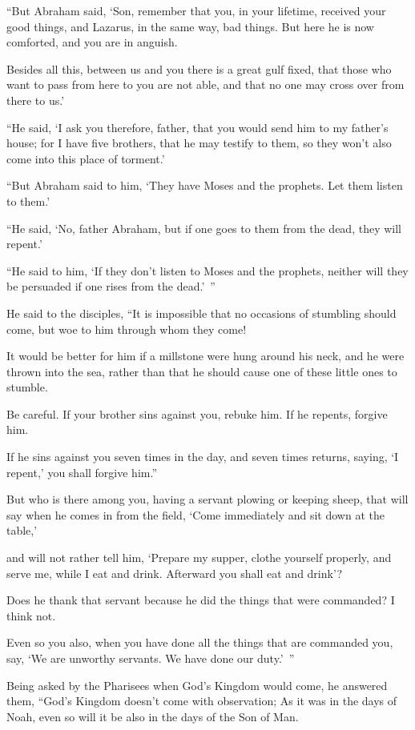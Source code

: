 “But Abraham said, ‘Son, remember that you, in your lifetime, received your good things, and Lazarus, in the same way, bad things. But here he is now comforted, and you are in anguish.

Besides all this, between us and you there is a great gulf fixed, that those who want to pass from here to you are not able, and that no one may cross over from there to us.’

“He said, ‘I ask you therefore, father, that you would send him to my father’s house; for I have five brothers, that he may testify to them, so they won’t also come into this place of torment.’

“But Abraham said to him, ‘They have Moses and the prophets. Let them listen to them.’

“He said, ‘No, father Abraham, but if one goes to them from the dead, they will repent.’

“He said to him, ‘If they don’t listen to Moses and the prophets, neither will they be persuaded if one rises from the dead.’ ”

He said to the disciples, “It is impossible that no occasions of stumbling should come, but woe to him through whom they come!

It would be better for him if a millstone were hung around his neck, and he were thrown into the sea, rather than that he should cause one of these little ones to stumble.

Be careful. If your brother sins against you, rebuke him. If he repents, forgive him.

If he sins against you seven times in the day, and seven times returns, saying, ‘I repent,’ you shall forgive him.”

But who is there among you, having a servant plowing or keeping sheep, that will say when he comes in from the field, ‘Come immediately and sit down at the table,’

and will not rather tell him, ‘Prepare my supper, clothe yourself properly, and serve me, while I eat and drink. Afterward you shall eat and drink’?

Does he thank that servant because he did the things that were commanded? I think not.

Even so you also, when you have done all the things that are commanded you, say, ‘We are unworthy servants. We have done our duty.’ ”

Being asked by the Pharisees when God’s Kingdom would come, he answered them, “God’s Kingdom doesn’t come with observation; As it was in the days of Noah, even so will it be also in the days of the Son of Man.

